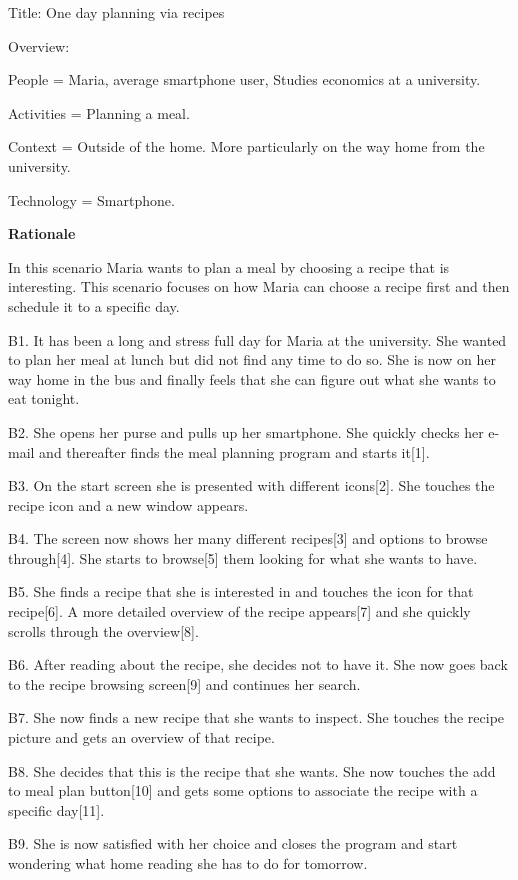 Title: One day planning via recipes

Overview:

	People = Maria, average smartphone user, Studies economics at a university. 
	
	Activities = Planning a meal.

	Context = Outside of the home. More particularly on the way home from the university.

	Technology = Smartphone.

\textbf{Rationale}

In this scenario Maria wants to plan a meal by choosing a recipe that is interesting. This scenario focuses on how Maria can choose a recipe first and then schedule it to a specific day.

	B1. It has been a long and stress full day for Maria at the university. She wanted to plan her meal at lunch but did not find any time to do so. She is now on her way home in the bus and finally feels that she can figure out what she wants to eat tonight.

	B2. She opens her purse and pulls up her smartphone. She quickly checks her e-mail and thereafter finds the meal planning program and starts it[1]. 

	B3. On the start screen she is presented with different icons[2]. She touches the recipe icon and a new window appears.

	B4. The screen now shows her many different recipes[3] and options to browse through[4]. She starts to browse[5] them looking for what she wants to have. 

	B5. She finds a recipe that she is interested in and touches the icon for that recipe[6]. A more detailed overview of the recipe appears[7] and she quickly scrolls through the overview[8].

	B6. After reading about the recipe, she decides not to have it. She now goes back to the recipe browsing screen[9] and continues her search.

	B7. She now finds a new recipe that she wants to inspect. She touches the recipe picture and gets an overview of that recipe. 

	B8. She decides that this is the recipe that she wants. She now touches the add to meal plan button[10] and gets some options to associate the recipe with a specific day[11].

	B9. She is now satisfied with her choice and closes the program and start wondering what home reading she has to do for tomorrow.
	
